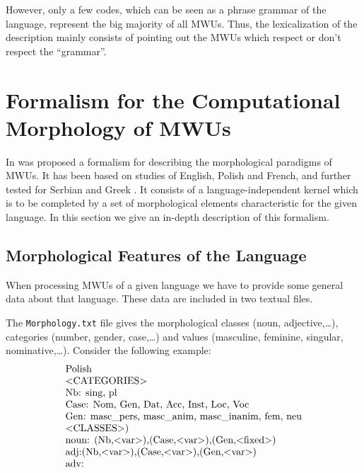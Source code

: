 \bigskip
\noindent However, only a few codes, which can be seen as a phrase grammar of the 
language, represent the big majority of all MWUs. Thus, the lexicalization of the 
description mainly consists of pointing out the MWUs which respect or don't respect 
the ``grammar''.

\section{Formalism for the Computational Morphology of MWUs}
\label{section:formalism}
In \cite{Savary05} was proposed a formalism for describing the morphological 
paradigms of MWUs. It has been based on studies of English, Polish and French, and 
further tested for Serbian \cite{Krstevetal06} and Greek \cite{Foufi13}. It consists of a language-independent 
kernel which is to be completed by a set of morphological elements characteristic for the 
given language. In this section we give an in-depth description of this
formalism.

\subsection{Morphological Features of the Language}
\label{subsec:langfeat}
When processing MWUs of a given language we have to provide some general data about 
that language. These data are included in two textual files.

\bigskip
\noindent The \verb+Morphology.txt+ file gives the morphological classes 
(noun, adjective,\dots), categories (number, gender, case,\dots) and values 
(masculine, feminine, singular, nominative,\dots). Consider the following example:
\[
\begin{array}[c]{ll}
$Polish$ \\
$$<$CATEGORIES$>$$ \\
$Nb: sing, pl$ \\
$Case: Nom, Gen, Dat, Acc, Inst, Loc, Voc$ \\
$Gen: masc\_pers, masc\_anim, masc\_inanim, fem, neu$ \\
$$<$CLASSES$>$)$ \\
$noun: (Nb,$<$var$>$),(Case,$<$var$>$),(Gen,$<$fixed$>$)$ \\
$adj:(Nb,$<$var$>$),(Case,$<$var$>$),(Gen,$<$var$>$)$ \\
$adv:$
\end{array}
\]

